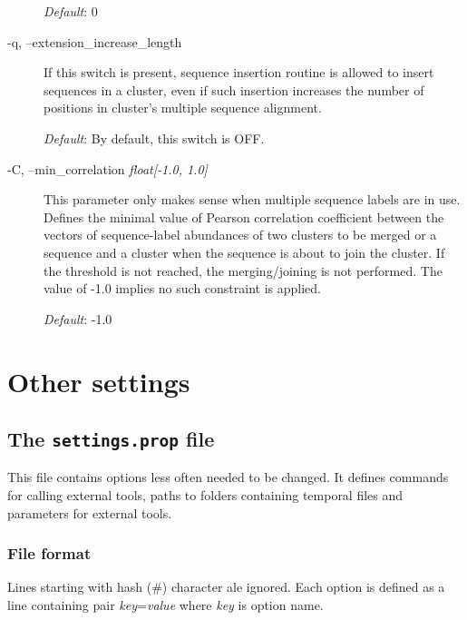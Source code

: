 \documentclass[11pt, a4paper, twoside, titlepage]{article}
\begin{document}
\begin{description}
	  	  	  	\textit{Default}: 0
	  	  	  	
	  	  	  	\item[-q, --extension\_increase\_length] If this switch is present, sequence insertion routine is allowed to insert sequences in a cluster, even if such insertion increases the number of positions in cluster's multiple sequence alignment. 
	  	  	  	
	  	  	  	\textit{Default}: By default, this switch is OFF. 

	  	  
	  	  	  	  	  	  \item[-C, --min\_correlation \rm \textlangle \textit{float[-1.0, 1.0]}\textrangle] This parameter only makes sense when multiple sequence labels are in use. Defines the minimal value of Pearson correlation coefficient between the vectors of sequence-label abundances of two clusters to be merged or a sequence and a cluster when the sequence is about to join the cluster. If the threshold is not reached, the merging/joining is not performed. The value of -1.0 implies no such constraint is applied.
	  	  	  	  	  	  	
	  	  
	  	  \textit{Default}: -1.0
	  	  	  	  


\end{description}


\section{Other settings}
\label{othersettings}
\subsection{The \texttt{settings.prop} file}
\label{settings.propfile}
This file contains options less often needed to be changed. It defines commands for calling external tools, paths to folders containing temporal files and parameters for external tools. 

\subsubsection{File format}
Lines starting with hash (\#) character ale ignored.\newline
Each option is defined as a line containing pair \textit{key}=\textit{value} where \textit{key} is option name. 
\end{document}
